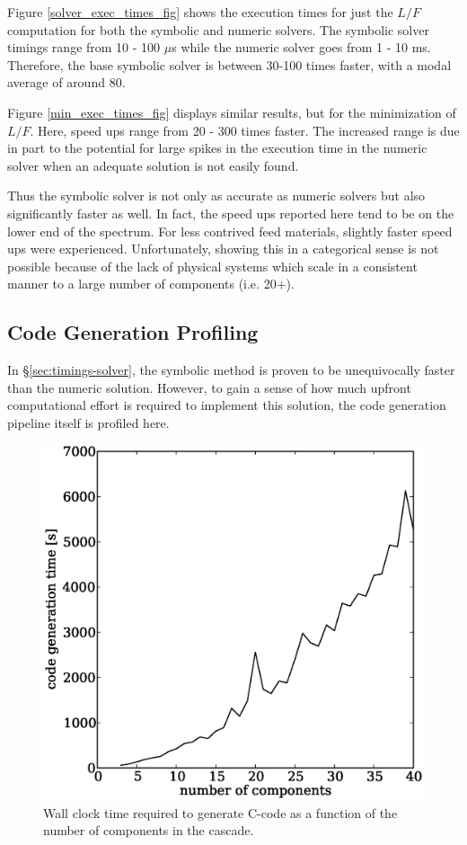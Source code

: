 \documentclass[preprint,12pt]{elsarticle}
\newcommand{\us}[0]{$\mu$s }
\begin{document}
Figure \ref{solver_exec_times_fig} shows the execution times for just the $L/F$ 
computation for both the symbolic and numeric solvers.  The symbolic solver timings 
range
from 10 - 100 \us while the numeric solver goes from 1 - 10 ms.  Therefore,
the base symbolic solver is between 30-100 times faster, with a modal average of
around 80.

Figure \ref{min_exec_times_fig} displays similar results, but for the minimization
of $L/F$.  Here, speed ups range from 20 - 300 times faster.  The increased range is 
due in part to the potential for large spikes in the execution time in the numeric 
solver when an adequate solution is not easily found.  

Thus the symbolic solver is not only as accurate as numeric solvers
but also significantly faster as well.  In fact, the speed ups reported here tend
to be on the lower end of the spectrum.  For less contrived feed materials, 
slightly faster speed ups were experienced.  Unfortunately, showing this in a 
categorical sense is not possible because of the lack of physical systems which 
scale in a consistent manner to a large number of components (i.e. 20+).


\subsection{Code Generation Profiling}
\label{sec:codegen-prof}
In \S\ref{sec:timings-solver}, the symbolic method is proven to be unequivocally
faster than the numeric solution.  However, to gain a sense of how much upfront 
computational effort is required to implement this solution, the code generation 
pipeline itself is profiled here.

\begin{figure}[htpb]
\begin{center}
\includegraphics[scale=0.5]{codegen_times.eps}
\caption{Wall clock time required to generate C-code as a function of the 
    number of components in the cascade.}
\label{codegen_times_fig}
\end{center}
\end{figure}
\end{document}
